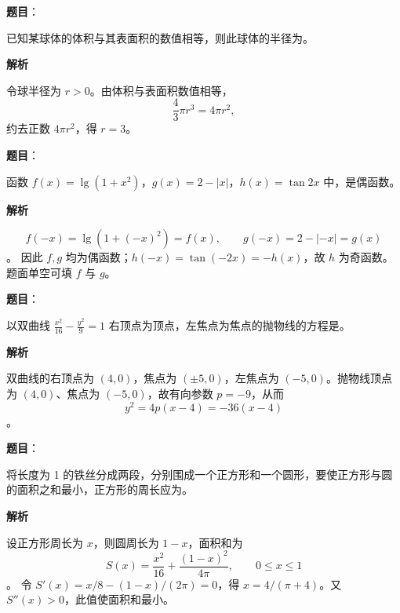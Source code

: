 \begin{answer}

\textbf{题目}：

已知某球体的体积与其表面积的数值相等，则此球体的半径为\gkblank{}。

\textbf{解析}

令球半径为 \(r>0\)。由体积与表面积数值相等，
\nopagebreak[4]
\[
\frac43\pi r^3=4\pi r^2,
\]
约去正数 \(4\pi r^2\)，得 \(r=3\)。


\end{answer}
\begin{answer}

\textbf{题目}：

函数 \(f(x)=\lg(1+x^2)\)，\(g(x)=2-|x|\)，\(h(x)=\tan 2x\) 中，\gkblank{}是偶函数。

\textbf{解析}

\nopagebreak[4]
\[
f(-x)=\lg(1+(-x)^2)=f(x),\qquad g(-x)=2-|-x|=g(x)
\]
。
因此 \(f,g\) 均为偶函数；\(h(-x)=\tan(-2x)=-h(x)\)，故 \(h\) 为奇函数。题面单空可填 \(f\) 与 \(g\)。


\end{answer}
\begin{answer}

\textbf{题目}：

以双曲线 \(\frac{x^2}{16}-\frac{y^2}{9}=1\) 右顶点为顶点，左焦点为焦点的抛物线的方程是\gkblank{}。

\textbf{解析}

双曲线的右顶点为 \((4,0)\)，焦点为 \((\pm5,0)\)，左焦点为 \((-5,0)\)。抛物线顶点为 \((4,0)\)、焦点为 \((-5,0)\)，故有向参数 \(p=-9\)，从而
\nopagebreak[4]
\[
y^2=4p(x-4)=-36(x-4)
\]
。


\end{answer}
\begin{answer}

\textbf{题目}：

将长度为 1 的铁丝分成两段，分别围成一个正方形和一个圆形，要使正方形与圆的面积之和最小，正方形的周长应为\gkblank{}。

\textbf{解析}

设正方形周长为 \(x\)，则圆周长为 \(1-x\)，面积和为
\nopagebreak[4]
\[
S(x)=\frac{x^2}{16}+\frac{(1-x)^2}{4\pi},\qquad 0\le x\le1
\]
。
令 \(S'(x)=x/8-(1-x)/(2\pi)=0\)，得 \(x=4/(\pi+4)\)。又 \(S''(x)>0\)，此值使面积和最小。


\end{answer}

